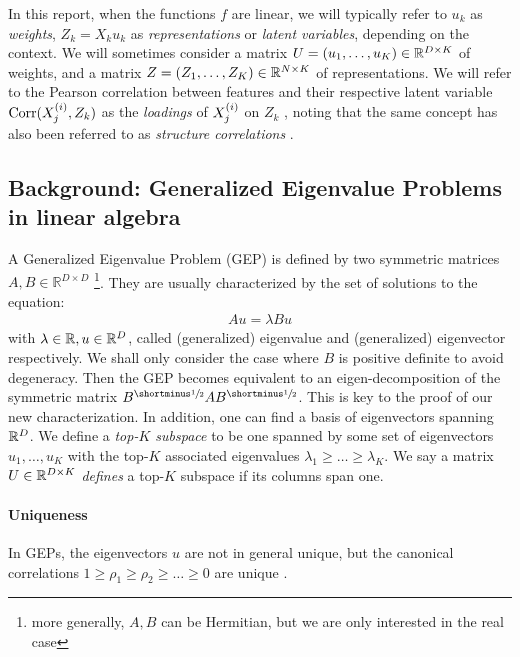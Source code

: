 In this report, when the functions $f$ are linear, we will typically refer to $u_k$ as \textit{\gls{weights}}, $Z_k = X_k u_k$ as \textit{\gls{representations}} or \textit{\gls{latent variables}}, depending on the context. We will sometimes consider a
matrix $U = \left(u_1, \dots, u_K\right) \in \mathbb{R}^{D \times K}$ of \gls{weights}, and a
matrix $Z = \left(Z_1, \dots, Z_K\right) \in \mathbb{R}^{N \times K}$ of representations.
We will refer to the Pearson correlation between features and their respective latent variable $\operatorname{Corr}(X^{(i)}_j, Z_k)$ as the \textit{\gls{loadings}} of $X^{(i)}_j$ on $Z_k$ \citep{rosipal2005overview, alpert1972interpretation}, noting that the same concept has also been referred to as \textit{structure correlations} \citep{meredith1964canonical}.

\subsection{Background: Generalized Eigenvalue Problems in linear algebra}
A Generalized Eigenvalue Problem (GEP) is defined by two symmetric matrices $A,B\in \mathbb{R}^{D\times D}$ \citep{stewart_matrix_1990}\footnote{more generally, $A,B$ can be Hermitian, but we are only interested in the real case}. They are usually characterized by the set of solutions to the equation:
\begin{align}
    \label{eq:igep}
    Au=\lambda Bu
\end{align}
with $\lambda \in \mathbb{R}, u \in \mathbb{R}^D$, called (generalized) eigenvalue and (generalized) eigenvector respectively. We shall only consider the case where $B$ is positive definite to avoid degeneracy.
Then the GEP becomes equivalent to an eigen-decomposition of the symmetric matrix $B^\mhalf A B^\mhalf$. This is key to the proof of our new characterization.
In addition, one can find a basis of eigenvectors spanning $\mathbb{R}^D$.
We define a \textit{top-$K$ subspace} to be one spanned by some set of eigenvectors {$u_1,\dots,u_K$} with the top-$K$ associated eigenvalues $\lambda_1 \geq \dots \geq \lambda_K$.
We say a matrix $U \in \mathbb{R}^{D \times K}$ \textit{defines} a top-$K$ subspace if its columns span one.

\paragraph{Uniqueness}
In GEPs, the eigenvectors $u$ are not in general unique, but the canonical correlations $1 \geq \rho_1 \geq \rho_2 \geq \dots \geq 0$ are unique \citep{mills1988calculation}.

